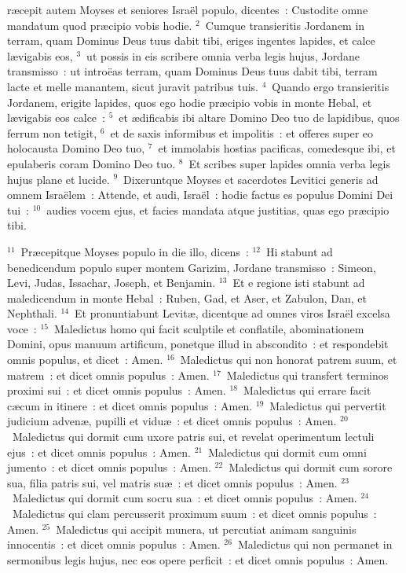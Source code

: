 \bchapter
{}r\ae cepit autem Moyses et seniores Isra\"el populo, dicentes~: Custodite omne mandatum quod pr\ae cipio vobis hodie.
${}^{2}$~Cumque transieritis Jordanem in terram, quam Dominus Deus tuus dabit tibi, eriges ingentes lapides, et calce l\ae vigabis eos,
${}^{3}$~ut possis in eis scribere omnia verba legis hujus, Jordane transmisso~: ut intro\"eas terram, quam Dominus Deus tuus dabit tibi, terram lacte et melle manantem, sicut juravit patribus tuis.
${}^{4}$~Quando ergo transieritis Jordanem, erigite lapides, quos ego hodie pr\ae cipio vobis in monte Hebal, et l\ae vigabis eos calce~:
${}^{5}$~et \ae dificabis ibi altare Domino Deo tuo de lapidibus, quos ferrum non tetigit,
${}^{6}$~et de saxis informibus et impolitis~: et offeres super eo holocausta Domino Deo tuo,
${}^{7}$~et immolabis hostias pacificas, comedesque ibi, et epulaberis coram Domino Deo tuo.
${}^{8}$~Et scribes super lapides omnia verba legis hujus plane et lucide.
${}^{9}$~Dixeruntque Moyses et sacerdotes Levitici generis ad omnem Isra\"elem~: Attende, et audi, Isra\"el~: hodie factus es populus Domini Dei tui~:
${}^{10}$~audies vocem ejus, et facies mandata atque justitias, quas ego pr\ae cipio tibi.


${}^{11}$~Pr\ae cepitque Moyses populo in die illo, dicens~:
${}^{12}$~Hi stabunt ad benedicendum populo super montem Garizim, Jordane transmisso~: Simeon, Levi, Judas, Issachar, Joseph, et Benjamin.
${}^{13}$~Et e regione isti stabunt ad maledicendum in monte Hebal~: Ruben, Gad, et Aser, et Zabulon, Dan, et Nephthali.
${}^{14}$~Et pronuntiabunt Levit\ae , dicentque ad omnes viros Isra\"el excelsa voce~:
${}^{15}$~Maledictus homo qui facit sculptile et conflatile, abominationem Domini, opus manuum artificum, ponetque illud in abscondito~: et respondebit omnis populus, et dicet~: Amen.
${}^{16}$~Maledictus qui non honorat patrem suum, et matrem~: et dicet omnis populus~: Amen.
${}^{17}$~Maledictus qui transfert terminos proximi sui~: et dicet omnis populus~: Amen.
${}^{18}$~Maledictus qui errare facit c\ae cum in itinere~: et dicet omnis populus~: Amen.
${}^{19}$~Maledictus qui pervertit judicium adven\ae , pupilli et vidu\ae~: et dicet omnis populus~: Amen.
${}^{20}$~Maledictus qui dormit cum uxore patris sui, et revelat operimentum lectuli ejus~: et dicet omnis populus~: Amen.
${}^{21}$~Maledictus qui dormit cum omni jumento~: et dicet omnis populus~: Amen.
${}^{22}$~Maledictus qui dormit cum sorore sua, filia patris sui, vel matris su\ae~: et dicet omnis populus~: Amen.
${}^{23}$~Maledictus qui dormit cum socru sua~: et dicet omnis populus~: Amen.
${}^{24}$~Maledictus qui clam percusserit proximum suum~: et dicet omnis populus~: Amen.
${}^{25}$~Maledictus qui accipit munera, ut percutiat animam sanguinis innocentis~: et dicet omnis populus~: Amen.
${}^{26}$~Maledictus qui non permanet in sermonibus legis hujus, nec eos opere perficit~: et dicet omnis populus~: Amen.

